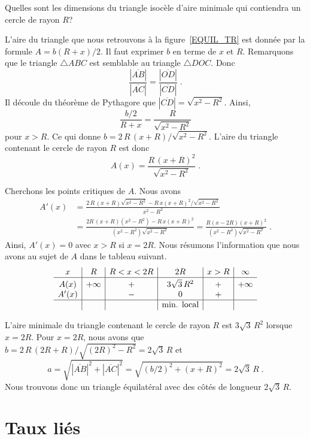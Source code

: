 {\begin{egg}[\eng]
Quelles sont les dimensions du triangle isocèle d'aire minimale qui
contiendra un cercle de rayon $R$?

L'aire du triangle que nous retrouvons à la figure~\ref{EQUIL_TR} est
donnée par la formule $A= b(R+x)/2$.  Il faut exprimer $b$ en terme de
$x$ et $R$.  Remarquons que le triangle $\triangle ABC$ est semblable
au triangle $\triangle DOC$.  Donc
\[
\frac{|\overline{AB}|}{|\overline{AC}|} =
\frac{|\overline{OD}|}{|\overline{CD}|}  \; .
\]
Il découle du théorème de Pythagore que $|\overline{CD}| = \sqrt{x^2-R^2}$.
Ainsi,
\[
\frac{b/2}{R+x} = \frac{R}{\sqrt{x^2-R^2}}
\]
pour $x>R$.  Ce qui donne $b = 2\,R\,(x+R)/\sqrt{x^2-R^2}$.  L'aire du
triangle contenant le cercle de rayon $R$ est donc
\[
A(x) = \frac{R\,(x+R)^2}{\sqrt{x^2-R^2}} \; .
\]

Cherchons les points critiques de $A$.  Nous avons
\begin{align*}
A'(x) &= \frac{2\,R\,(x+R)\sqrt{x^2-R^2} -
  R\,x(x+R)^2/\sqrt{x^2-R^2}}{x^2-R^2} \\
&= \frac{2R\,(x+R)(x^2-R^2) - R\,x(x+R)^2}{(x^2-R^2)\sqrt{x^2-R^2}}
= \frac{R(x-2R)(x+R)^2}{(x^2-R^2)\sqrt{x^2-R^2}} \; .
\end{align*}
Ainsi, $A'(x)=0$ avec $x>R$ si $x=2R$.  Nous résumons l'information que
nous avons au sujet de $A$ dans le tableau suivant.
\[
\begin{array}{c|c|c|c|c|c}
x & R & R < x < 2R & 2R & x>R & \infty \\
\hline
\rule{0em}{1.1em} A(x) & +\infty & + & 3\sqrt{3}\,R^2 & + & +\infty \\
A'(x) &  & - & 0 & + & \\
\hline
 & & & \text{min. local} & & \\
\end{array}
\]

L'aire minimale du triangle contenant le cercle de rayon $R$ est
$3\sqrt{3}\,R^2$ lorsque $x=2R$. Pour $x=2R$, nous avons que
$b = 2\,R\,(2R + R)/\sqrt{(2R)^2-R^2} = 2\sqrt{3}\,R$ et 
\[
a = \sqrt{|\overline{AB}|^2 + |\overline{AC}|^2}
= \sqrt{(b/2)^2+(x+R)^2} = 2\sqrt{3}\,R \; .
\]
Nous trouvons donc un triangle équilatéral avec des côtés de longueur
$2\sqrt{3}\,R$.
\end{egg}


\section{Taux liés \eng}

}
